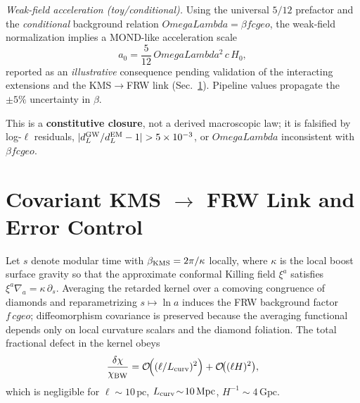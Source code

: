 \documentclass[aps,prd,onecolumn,superscriptaddress,nofootinbib]{revtex4-2}
\def\OmL{OmegaLambda}%
\def\cgeo{cgeo}%
\def\Omega_\Lambda{OmegaLambda}%
\providecommand{\OmL}{\Omega_\Lambda}
\providecommand{\cgeo}{c_{\rm geo}}
\providecommand{\be}{\begin{equation}}
\providecommand{\ee}{\end{equation}}
\begin{document}
\noindent \emph{Weak-field acceleration (toy/conditional).} Using the universal \(5/12\) prefactor and the \emph{conditional} background relation \(\OmL=\beta f\cgeo\), the weak-field normalization implies a MOND-like acceleration scale
\be
a_0=\frac{5}{12}\,\OmL^2\,c\,H_0,
\ee
reported as an \emph{illustrative} consequence pending validation of the interacting extensions and the KMS\(\to\)FRW link (Sec.~\ref{sec:kms-frw}). Pipeline values propagate the \(\pm 5\%\) uncertainty in \(\beta\).

This is a \textbf{constitutive closure}, not a derived macroscopic law; it is falsified by log-\(\ell\) residuals, \(|d_L^{\rm GW}/d_L^{\rm EM}-1|>5\times 10^{-3}\), or \(\OmL\) inconsistent with \(\beta f\cgeo\).

\section{Covariant KMS \texorpdfstring{$\to$}{->} FRW Link and Error Control}
\label{sec:kms-frw}
Let \(s\) denote modular time with \(\beta_{\rm KMS}=2\pi/\kappa\) locally, where \(\kappa\) is the local boost surface gravity so that the approximate conformal Killing field \(\xi^a\) satisfies \(\xi^a\nabla_a=\kappa\,\partial_s\).
Averaging the retarded kernel over a comoving congruence of diamonds and reparametrizing \(s\mapsto \ln a\) induces the FRW background factor \(f\,\cgeo\); diffeomorphism covariance is preserved because the averaging functional depends only on local curvature scalars and the diamond foliation. The total fractional defect in the kernel obeys
\be
\label{eq:chi-defect}
\frac{\delta\chi}{\chi_{\rm BW}}=\mathcal O\!\Big((\ell/L_{\rm curv})^2\Big)+\mathcal O\!\big((\ell H)^2\big),
\ee
which is negligible for \(\ell\!\sim\!10\,\mathrm{pc}\), \(L_{\rm curv}\!\sim\!10\,\mathrm{Mpc}\), \(H^{-1}\!\sim\!4\,\mathrm{Gpc}\).
\smallskip
\end{document}
